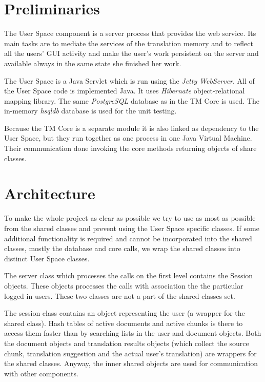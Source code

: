 \section{Preliminaries}

The User Space component is a server process that provides the web service. Its main tasks are to mediate the services of the translation memory and to reflect all the users' GUI activity and make the user's work persistent on the server and available always in the same state she finished her work.

The User Space is a Java Servlet which is run using the \emph{Jetty WebServer}. All of the User Space code is implemented Java. It uses \emph{Hibernate} object-relational mapping library. The same \emph{PostgreSQL} database as in the TM Core is used. The in-memory \emph{hsqldb} database is used for the unit testing.

Because the TM Core is a separate module it is also linked as dependency to the User Space, but they run together as one process in one Java Virtual Machine. Their communication done invoking the core methods returning objects of share classes.

\section{Architecture}

To make the whole project as clear as possible we try to use as most as possible from the shared classes and prevent using the User Space specific classes. If some additional functionality is required and cannot be incorporated into the shared classes, mostly the database and core calls, we wrap the shared classes into distinct User Space classes.

The server class which processes the calls on the first level contains the Session objects. These objects processes the calls with association the the particular logged in users. These two classes are not a part of the shared classes set.

The session class contains an object representing the user (a wrapper for the shared class). Hash tables of active documents and active chunks is there to access them faster than by searching lists in the user and document objects. Both the document objects and translation results objects (which collect the source chunk, translation suggestion and the actual user's translation) are wrappers for the shared classes. Anyway, the inner shared objects are used for communication with other components.

